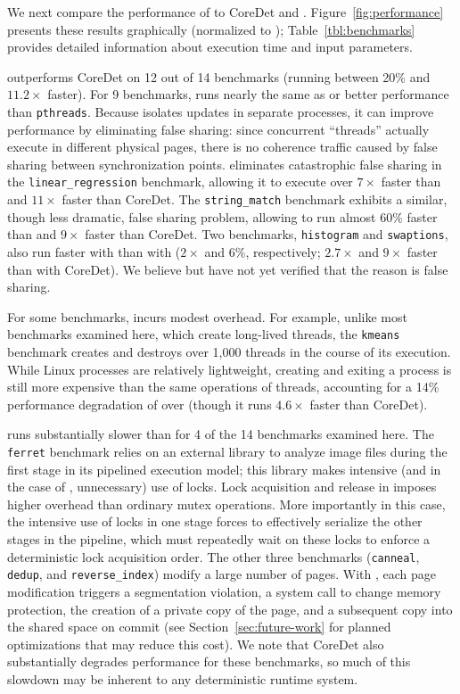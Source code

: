We next compare the performance of \dthreads{} to CoreDet
and \pthreads{}. Figure~\ref{fig:performance} presents these results graphically (normalized to \pthreads{}); Table~\ref{tbl:benchmarks} provides detailed information about execution time and input parameters.

\dthreads{} outperforms CoreDet on 12 out of 14 benchmarks (running between 20\% and $11.2\times$ faster). For 9 benchmarks, \dthreads{} runs nearly the same as or better
performance than \texttt{pthreads}. Because \dthreads{} isolates updates in separate processes, it can improve performance by eliminating false sharing: since concurrent ``threads'' actually execute in different physical pages, there is no coherence traffic caused by false sharing between synchronization points. \dthreads{} eliminates catastrophic false sharing in the \texttt{linear\_regression} benchmark, allowing it to execute over $7\times$ faster than \pthreads{} and $11\times$ faster than CoreDet. The \texttt{string\_match} benchmark exhibits a similar, though less dramatic, false sharing problem, allowing \dthreads{} to run almost 60\% faster than \pthreads{} and $9\times$ faster than CoreDet. Two benchmarks, \texttt{histogram} and \texttt{swaptions}, also run faster with \dthreads{} than with \pthreads{} ($2\times$ and $6\%$, respectively; $2.7\times$ and $9\times$ faster than with CoreDet). We believe but have not yet verified that the reason is false sharing.

For some benchmarks, \dthreads{} incurs modest overhead. For example, unlike most benchmarks examined here, which create long-lived threads, the \texttt{kmeans} benchmark creates and destroys over 1,000 threads in the course of its execution. 
While Linux processes are relatively lightweight, creating and exiting a process is still more expensive than the same operations of threads, accounting for a 14\% performance degradation of \dthreads{} over \pthreads{} (though it runs $4.6\times$ faster than CoreDet).

\dthreads{} runs substantially slower than \pthreads{} for 4 of the 14 benchmarks examined here. The \texttt{ferret} benchmark relies on an external library to analyze image files during the first stage in its pipelined execution model; this library makes intensive (and in the case of \dthreads{}, unnecessary) use of locks. Lock acquisition and release in \dthreads{} imposes higher overhead than ordinary \pthreads{} mutex operations. More importantly in this case, the intensive use of locks in one stage forces \dthreads{} to effectively serialize the other stages in the pipeline, which must repeatedly wait on these locks to enforce a deterministic lock acquisition order. The other three benchmarks (\texttt{canneal}, \texttt{dedup}, and \texttt{reverse\_index}) modify a large number of pages. With \dthreads{}, each page modification triggers a segmentation violation, a system call to change memory protection, the creation of a private copy of the page, and a subsequent copy into the shared space on commit (see Section~\ref{sec:future-work} for planned optimizations that may reduce this cost). We note that CoreDet also substantially degrades performance for these benchmarks, so much of this slowdown may be inherent to any deterministic runtime system.


